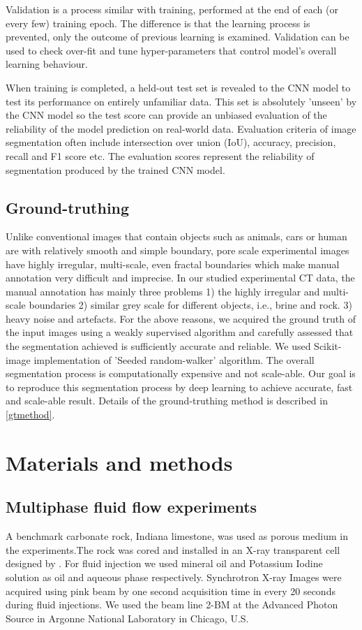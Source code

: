 \documentclass[draft,linenumbers]{agujournal2018}
\begin{document}
Validation is a process similar with training, performed at the end of each (or every few) training epoch. The difference is that the learning process is prevented, only the outcome of previous learning is examined. Validation can be used to check over-fit and tune hyper-parameters that control model's overall learning behaviour. 

When training is completed, a held-out test set is revealed to the CNN model to test its performance on entirely unfamiliar data. This set is absolutely 'unseen' by the CNN model so the test score can provide an unbiased evaluation of the reliability of the model prediction on real-world data. Evaluation criteria of image segmentation often include intersection over union (IoU), accuracy, precision, recall and F1 score etc. The evaluation scores represent the reliability of segmentation produced by the trained CNN model.

\subsection{Ground-truthing}\label{gtintro}
Unlike conventional images that contain objects such as animals, cars or human are with relatively smooth and simple boundary, pore scale experimental images have highly irregular, multi-scale, even fractal boundaries which make manual annotation very difficult and imprecise. In our studied experimental CT data, the manual annotation has mainly three problems 1) the highly irregular and multi-scale boundaries 2) similar grey scale for different objects, i.e., brine and rock. 3) heavy noise and artefacts. For the above reasons, we acquired the ground truth of the input images using a weakly supervised algorithm and carefully assessed that the segmentation achieved is sufficiently accurate and reliable. We used Scikit-image implementation of 'Seeded random-walker' \citep{grady2006random} algorithm. The overall segmentation process is computationally expensive and not scale-able. Our goal is to reproduce this segmentation process by deep learning to achieve accurate, fast and scale-able result. Details of the ground-truthing method is described in \ref{gtmethod}.

\section{Materials and methods}
\subsection{Multiphase fluid flow experiments}
A benchmark carbonate rock, Indiana limestone, was used as porous medium in the experiments.The rock was cored and installed in an X-ray transparent cell designed by \citet{fusseis2014low}. For fluid injection we used mineral oil and Potassium Iodine solution as oil and aqueous phase respectively. Synchrotron X-ray Images were acquired using pink beam by one second acquisition time in every 20 seconds during fluid injections. We used the beam line 2-BM at the Advanced Photon Source in Argonne National Laboratory in Chicago, U.S.
\end{document}
